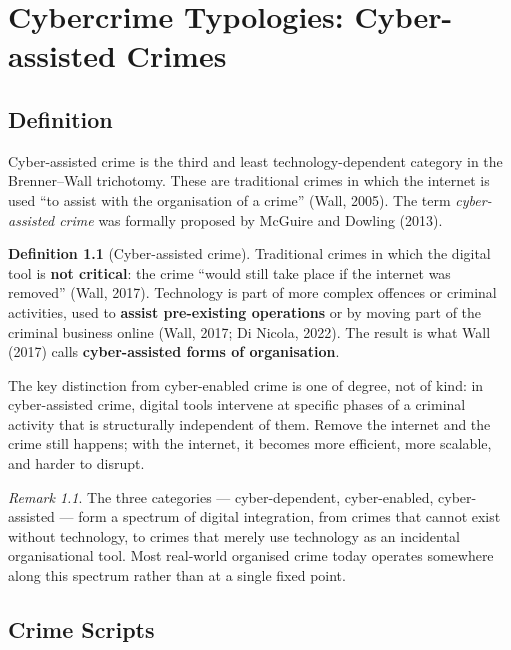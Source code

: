 \documentclass[11pt,a4paper,openany]{report}
\theoremstyle{definition}
\newtheorem{definition}{Definition}[chapter]
\theoremstyle{plain}
\theoremstyle{remark}
\newtheorem*{remark}{Remark}
\begin{document}
\chapter{Cybercrime Typologies: Cyber-assisted Crimes}

\section{Definition}

Cyber-assisted crime is the third and least technology-dependent category in the Brenner--Wall trichotomy. These are traditional crimes in which the internet is used ``to assist with the organisation of a crime'' (Wall, 2005). The term \textit{cyber-assisted crime} was formally proposed by McGuire and Dowling (2013).

\begin{definition}[Cyber-assisted crime]
Traditional crimes in which the digital tool is \textbf{not critical}: the crime ``would still take place if the internet was removed'' (Wall, 2017). Technology is part of more complex offences or criminal activities, used to \textbf{assist pre-existing operations} or by moving part of the criminal business online (Wall, 2017; Di Nicola, 2022). The result is what Wall (2017) calls \textbf{cyber-assisted forms of organisation}.
\end{definition}

The key distinction from cyber-enabled crime is one of degree, not of kind: in cyber-assisted crime, digital tools intervene at specific phases of a criminal activity that is structurally independent of them. Remove the internet and the crime still happens; with the internet, it becomes more efficient, more scalable, and harder to disrupt.

\begin{remark}
The three categories --- cyber-dependent, cyber-enabled, cyber-assisted --- form a spectrum of digital integration, from crimes that cannot exist without technology, to crimes that merely use technology as an incidental organisational tool. Most real-world organised crime today operates somewhere along this spectrum rather than at a single fixed point.
\end{remark}


\section{Crime Scripts}
\end{document}
